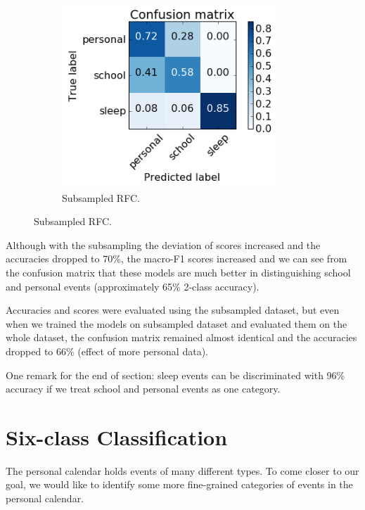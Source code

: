\documentclass[a4paper, 12pt]{article}
\begin{document}
\begin{figure}[h!]
\begin{subfigure}{.3\textwidth}
  \centering
  \includegraphics[width=1\linewidth]{3class-ss-cm-rfc.png}
  \caption{Subsampled RFC.}
\end{subfigure}
\end{figure}

Although with the subsampling the deviation of scores increased 
and the accuracies dropped to 70\%, the macro-F1 scores increased
and we can see from the confusion matrix that these models are much
better in distinguishing school and personal events (approximately 65\%
2-class accuracy).

Accuracies and scores were evaluated using the subsampled dataset,
but even when we trained the models on subsampled dataset and evaluated
them on the whole dataset, the confusion matrix remained almost identical
and the accuracies dropped to 66\% (effect of more personal data).

One remark for the end of section: sleep events can be discriminated with 96\%
accuracy if we treat school and personal events as one category.

\section{Six-class Classification}
The personal calendar holds events of many different types. To come closer 
to our goal, we would like to identify some more fine-grained categories 
of events in the personal calendar.
\end{document}
